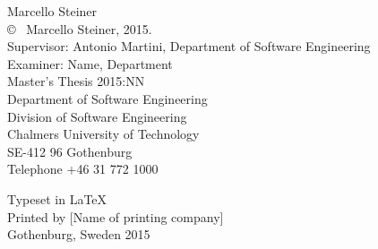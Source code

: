 \newpage
\thispagestyle{plain}
\vspace*{4.5cm}
Marcello Steiner\\[0.5cm]

\copyright ~ Marcello Steiner, 2015.\\[0.5cm]

Supervisor: Antonio Martini, Department of Software Engineering\\
Examiner: Name, Department\\[0.5cm]

Master's Thesis 2015:NN\\
Department of Software Engineering\\
Division of Software Engineering\\
Chalmers University of Technology\\
SE-412 96 Gothenburg\\
Telephone +46 31 772 1000\\

\vfill

Typeset in \LaTeX \\
Printed by [Name of printing company]\\
Gothenburg, Sweden 2015
